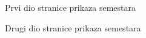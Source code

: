\documentclass[times, utf8, zavrsni, numeric]{fer}
\begin{document}
    \begin{figure} [H]
      \centering
      \caption{Prvi dio stranice prikaza semestara}
    \end{figure}
    
    \begin{figure} [H]
      \centering
      \caption{Drugi dio stranice prikaza semestara}
    \end{figure}
    
\end{document}
